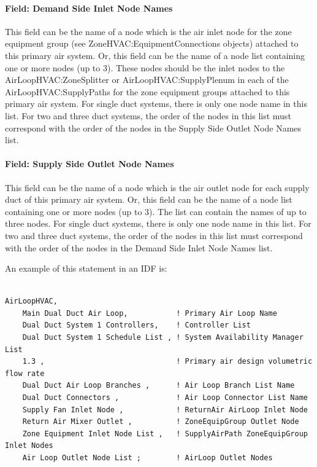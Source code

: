 \paragraph{Field: Demand Side Inlet Node Names}\label{field-demand-side-inlet-node-names}

This field can be the name of a node which is the air inlet node for the zone equipment group (see ZoneHVAC:EquipmentConnections objects) attached to this primary air system. Or, this field can be the name of a node list containing one or more nodes (up to 3). These nodes should be the inlet nodes to the AirLoopHVAC:ZoneSplitter or AirLoopHVAC:SupplyPlenum in each of the AirLoopHVAC:SupplyPaths for the zone equipment groups attached to this primary air system. For single duct systems, there is only one node name in this list. For two and three duct systems, the order of the nodes in this list must correspond with the order of the nodes in the Supply Side Outlet Node Names list.

\paragraph{Field: Supply Side Outlet Node Names}\label{field-supply-side-outlet-node-names}

This field can be the name of a node which is the air outlet node for each supply duct of this primary air system. Or, this field can be the name of a node list containing one or more nodes (up to 3). The list can contain the names of up to three nodes. For single duct systems, there is only one node name in this list. For two and three duct systems, the order of the nodes in this list must correspond with the order of the nodes in the Demand Side Inlet Node Names list.

An example of this statement in an IDF is:

\begin{lstlisting}

AirLoopHVAC,
    Main Dual Duct Air Loop,           ! Primary Air Loop Name
    Dual Duct System 1 Controllers,    ! Controller List
    Dual Duct System 1 Schedule List , ! System Availability Manager List
    1.3 ,                              ! Primary air design volumetric flow rate
    Dual Duct Air Loop Branches ,      ! Air Loop Branch List Name
    Dual Duct Connectors ,             ! Air Loop Connector List Name
    Supply Fan Inlet Node ,            ! ReturnAir AirLoop Inlet Node
    Return Air Mixer Outlet ,          ! ZoneEquipGroup Outlet Node
    Zone Equipment Inlet Node List ,   ! SupplyAirPath ZoneEquipGroup Inlet Nodes
    Air Loop Outlet Node List ;        ! AirLoop Outlet Nodes
\end{lstlisting}

